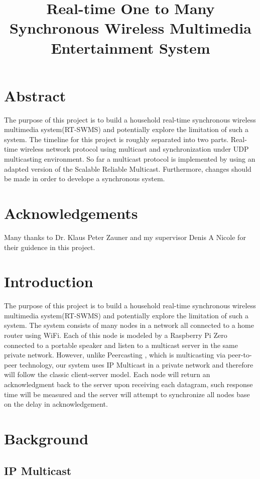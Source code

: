 \documentclass[12pt]{article}
\title{Real-time One to Many Synchronous Wireless Multimedia Entertainment System}
\begin{document}
\section*{Abstract}
The purpose of this project is to build a household real-time synchronous wireless multimedia system(RT-SWMS) and potentially explore the limitation of such a system. The timeline for this project is roughly separated into two parts. Real-time wireless network protocol using multicast and synchronization under UDP multicasting environment. So far a multicast protocol is implemented by using an adapted version of the Scalable Reliable Multicast. Furthermore, changes should be made in order to develope a synchronous system.

\pagebreak

\section*{Acknowledgements}
Many thanks to Dr. Klaus Peter Zauner and my supervisor Denis A Nicole for their guidence in this project.
\pagebreak



\section{Introduction}
The purpose of this project is to build a household real-time synchronous wireless multimedia system(RT-SWMS) and potentially explore the limitation of such a system. The system consists of many nodes in a network all connected to a home router using WiFi. Each of this node is modeled by a Raspberry Pi Zero connected to a portable speaker and listen to a multicast server in the same private network. However, unlike Peercasting \cite{Peercasting:1}, which is multicasting via peer-to-peer technology, our system uses IP Multicast in a private network and therefore will follow the classic client-server model. Each node will return an acknowledgment back to the server upon receiving each datagram, such response time will be measured and the server will attempt to synchronize all nodes base on the delay in acknowledgement.


\section{Background}

\subsection{IP Multicast}
\end{document}
